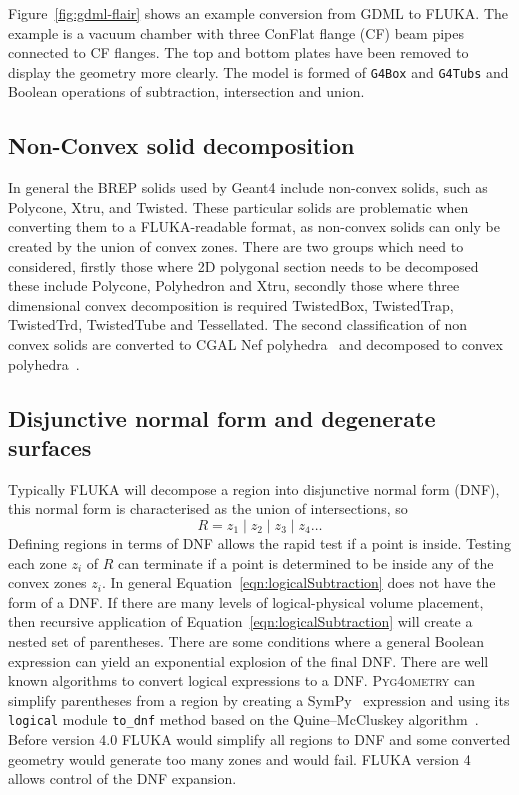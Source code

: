 \documentclass[final,5p,times,twocolumn]{elsarticle}
\newcommand{\PYGEOMETRY}{\textsc{Pyg4ometry}}
\begin{document}
Figure~\ref{fig:gdml-flair} shows an example conversion from GDML to FLUKA. The example is a 
vacuum chamber with three ConFlat flange (CF) beam pipes connected to CF flanges. The top and bottom plates 
have been removed to display the geometry more clearly. The model is formed of \verb|G4Box| and
\verb|G4Tubs| and Boolean operations of subtraction, intersection and union.

\subsection{Non-Convex solid decomposition}
In general the BREP solids used by Geant4 include non-convex solids, such as  Polycone, Xtru, and Twisted.  These 
particular solids are problematic when converting them to a FLUKA-readable format, as non-convex solids 
can only be created by the union of convex zones. There are two groups which need to considered, firstly those 
where 2D polygonal section needs to be decomposed these include Polycone, Polyhedron and Xtru, secondly 
those where three dimensional convex decomposition is required  TwistedBox, TwistedTrap, TwistedTrd, 
TwistedTube and Tessellated. The second classification of non convex solids are converted to CGAL 
Nef polyhedra~\cite{cgal:hk-bonp3-20b} and decomposed to convex polyhedra~\cite{cgal:h-emspe-20b}.

\subsection{Disjunctive normal form and degenerate surfaces}
Typically FLUKA will decompose a region into disjunctive normal form (DNF), this normal form is 
characterised as the union of intersections, so 
\begin{equation}
R = z_1 \; | \;z_2\;  | \; z_3 	\; | \; z_4 \dots
\end{equation}
Defining regions in terms of DNF allows the rapid test if a point is inside. Testing each zone 
$z_i$ of $R$ can terminate if a point is determined to be inside any of the convex zones $z_i$. In general 
Equation~\ref{eqn:logicalSubtraction} does not have the form of a DNF. If there are many levels of logical-physical volume 
placement, then recursive application of  Equation~\ref{eqn:logicalSubtraction} will create a nested set of 
parentheses. There are some conditions where a general Boolean expression can yield an exponential 
explosion of the final DNF. There are well known algorithms to convert logical expressions to a DNF. 
\PYGEOMETRY{} can simplify parentheses from a region by creating a SymPy~\cite{10.7717/peerj-cs.103} 
expression and using its \verb|logical| module \verb|to_dnf| method based on the Quine–McCluskey algorithm~\cite{6769983}. 
Before version 4.0 FLUKA  would simplify all regions to DNF and some converted geometry would generate 
too many zones and would fail. FLUKA version 4 allows control of the DNF expansion.
\end{document}
